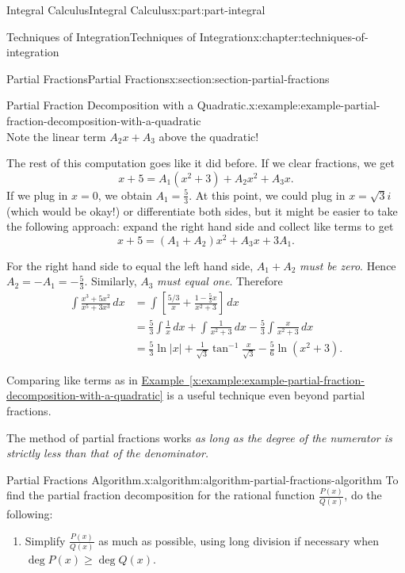 \documentclass[twoside,10pt,]{tufte-book}
\newcommand{\xreffont}{\relax}
\numberwithin{equation}{part}
\begin{document}
\begin{partptx}{Integral Calculus}{}{Integral Calculus}{}{}{x:part:part-integral}
\begin{chapterptx}{Techniques of Integration}{}{Techniques of Integration}{}{}{x:chapter:techniques-of-integration}
\begin{sectionptx}{Partial Fractions}{}{Partial Fractions}{}{}{x:section:section-partial-fractions}
\begin{example}{Partial Fraction Decomposition with a Quadratic.}{x:example:example-partial-fraction-decomposition-with-a-quadratic}
\begin{equation*}
\end{equation*}
Note the linear term \(A_{2}x + A_{3}\) above the quadratic!%
\par
The rest of this computation goes like it did before. If we clear fractions, we get%
\begin{equation*}
x + 5 = A_{1}(x^{2} + 3) + A_{2}x^{2} + A_{3}x.
\end{equation*}
If we plug in \(x = 0\), we obtain \(A_{1} = \frac{5}{3}\). At this point, we could plug in \(x = \sqrt{3}i\) (which would be okay!) or differentiate both sides, but it might be easier to take the following approach: expand the right hand side and collect like terms to get%
\begin{equation*}
x + 5 = (A_{1} + A_{2})x^{2} + A_{3}x + 3A_{1}.
\end{equation*}
%
\par
For the right hand side to equal the left hand side, \(A_{1} + A_{2}\) \emph{must be zero}. Hence \(A_{2} = -A_{1} = -\frac{5}{3}\). Similarly, \(A_{3}\) \emph{must equal one}. Therefore%
\begin{align*}
\int\frac{x^{3} + 5x^{2}}{x^{5} + 3x^{3}}\,dx & = \int\left[\frac{5/3}{x} + \frac{1 - \frac{5}{3}x}{x^{2} + 3}\right]\,dx \\
& = \frac{5}{3}\int\frac{1}{x}\,dx + \int\frac{1}{x^{2} + 3}\,dx - \frac{5}{3}\int\frac{x}{x^{2} + 3}\,dx \\
& = \frac{5}{3}\ln|x| + \frac{1}{\sqrt{3}}\tan^{-1}\frac{x}{\sqrt{3}} - \frac{5}{6}\ln(x^{2} + 3). 
\end{align*}
%
\end{example}
Comparing like terms as in \hyperref[x:example:example-partial-fraction-decomposition-with-a-quadratic]{Example~{\xreffont\ref{x:example:example-partial-fraction-decomposition-with-a-quadratic}}} is a useful technique even beyond partial fractions.%
\par
The method of partial fractions works \emph{as long as the degree of the numerator is strictly less than that of the denominator.}%
\begin{algorithm}{Partial Fractions Algorithm.}{}{x:algorithm:algorithm-partial-fractions-algorithm}%
%
To find the partial fraction decomposition for the rational function \(\frac{P(x)}{Q(x)}\), do the following:%
\begin{enumerate}
\item{}Simplify \(\frac{P(x)}{Q(x)}\) as much as possible, using long division if necessary when \(\deg P(x) \geq \deg Q(x)\).%

\end{enumerate}
\end{algorithm}
\end{sectionptx}
\end{chapterptx}
\end{partptx}
\end{document}
